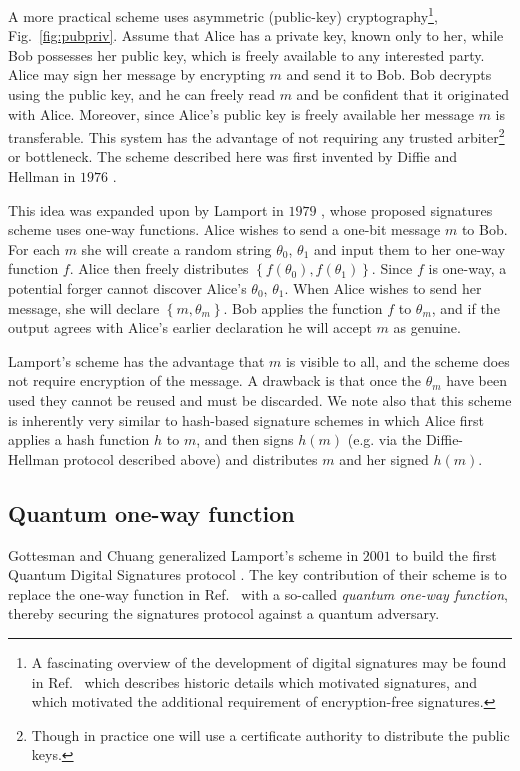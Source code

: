 A more practical scheme uses asymmetric (public-key) cryptography\footnote{A fascinating overview of the development of digital signatures may be found in Ref.~\cite{Simmons1988} which describes historic details which motivated signatures, and which motivated the additional requirement of encryption-free signatures.}, Fig.~\ref{fig:pubpriv}. Assume that Alice has a private key, known only to her, while Bob possesses her public key, which is freely available to any interested party. Alice may sign her message by encrypting $m$ and send it to Bob. Bob decrypts using the public key, and he can freely read $m$ and be confident that it originated with Alice. Moreover, since Alice's public key is freely available her message $m$ is transferable. This system has the advantage of not requiring any trusted arbiter\footnote{Though in practice one will use a certificate authority to distribute the public keys.} or bottleneck. The scheme described here was first invented by Diffie and Hellman in $1976$ \cite{Diffie1976}.

This idea was expanded upon by Lamport in $1979$ \cite{Lamport1979}, whose proposed signatures scheme uses one-way functions. Alice wishes to send a one-bit message $m$ to Bob. For each $m$ she will create a random string $\theta_0$, $\theta_1$ and input them to her one-way function $f$. Alice then freely distributes $\left\{f\left(\theta_0\right), f\left(\theta_1\right)\right\}$. Since $f$ is one-way, a potential forger cannot discover Alice's $\theta_0$, $\theta_1$. When Alice wishes to send her message, she will declare $\left\{m, \theta_m\right\}$. Bob applies the function $f$ to $\theta_m$, and if the output agrees with Alice's earlier declaration he will accept $m$ as genuine. 

Lamport's scheme has the advantage that $m$ is visible to all, and the scheme does not require encryption of the message. A drawback is that once the $\theta_m$ have been used they cannot be reused and must be discarded. We note also that this scheme is inherently very similar to hash-based signature schemes in which Alice first applies a hash function $h$ \cite{Schneier1996} to $m$, and then signs $h\left(m\right)$ (e.g. via the Diffie-Hellman protocol described above) and distributes $m$ and her signed $h\left(m\right)$.



\subsection{Quantum one-way function}
Gottesman and Chuang generalized Lamport's scheme in $2001$ to build the first Quantum Digital Signatures protocol \cite{Gottesman2001}. The key contribution of their scheme is to replace the one-way function in Ref.~\cite{Lamport1979} with a so-called \emph{quantum one-way function}, thereby securing the signatures protocol against a quantum adversary.



